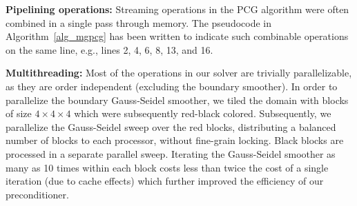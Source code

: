 \noindent\textbf{Pipelining operations:} Streaming operations in the PCG algorithm  were often combined in a single pass through memory. The pseudocode in Algorithm~\ref{alg_mgpcg} has
been written to indicate such combinable operations on the same line, e.g., lines 2, 4, 6, 8, 13, and 16.

\noindent\textbf{Multithreading:} Most of the operations in our solver are trivially parallelizable, as they are order independent (excluding the boundary smoother). In order to parallelize the boundary Gauss-Seidel smoother, we tiled the domain with blocks of size $4\times 4\times 4$ which were subsequently red-black
colored. Subsequently, we parallelize the Gauss-Seidel sweep over the red blocks, distributing a balanced number of blocks to each processor, without fine-grain locking. Black blocks are
processed in a separate parallel sweep. 
Iterating the Gauss-Seidel smoother as many as 10 times within each block costs less than twice
the cost of a single iteration (due to cache effects) which further improved the efficiency of our preconditioner.

